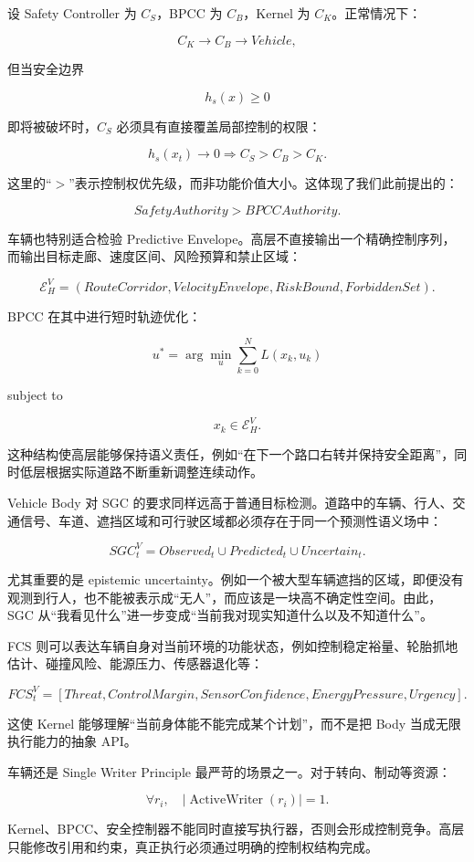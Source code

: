 设 Safety Controller 为 $C_S$，BPCC 为 $C_B$，Kernel 为 $C_K$。正常情况下：

$$
C_K\rightarrow C_B\rightarrow Vehicle,
$$

但当安全边界

$$
h_s(x)\geq0
$$

即将被破坏时，$C_S$ 必须具有直接覆盖局部控制的权限：

$$
h_s(x_t)\rightarrow0
\Rightarrow
C_S>C_B>C_K.
$$

这里的“$>$”表示控制权优先级，而非功能价值大小。这体现了我们此前提出的：

$$
\boxed{
SafetyAuthority>BPCCAuthority.
}
$$

车辆也特别适合检验 Predictive Envelope。高层不直接输出一个精确控制序列，而输出目标走廊、速度区间、风险预算和禁止区域：

$$
\mathcal E_H^V
=
(
RouteCorridor,
VelocityEnvelope,
RiskBound,
ForbiddenSet
).
$$

BPCC 在其中进行短时轨迹优化：

$$
u^{*}
=
\arg\min_u
\sum_{k=0}^{N}
L(x_k,u_k)
$$

subject to

$$
x_k\in\mathcal E_H^V.
$$

这种结构使高层能够保持语义责任，例如“在下一个路口右转并保持安全距离”，同时低层根据实际道路不断重新调整连续动作。

Vehicle Body 对 SGC 的要求同样远高于普通目标检测。道路中的车辆、行人、交通信号、车道、遮挡区域和可行驶区域都必须存在于同一个预测性语义场中：

$$
SGC_t^V
=
Observed_t
\cup
Predicted_t
\cup
Uncertain_t.
$$

尤其重要的是 epistemic uncertainty。例如一个被大型车辆遮挡的区域，即便没有观测到行人，也不能被表示成“无人”，而应该是一块高不确定性空间。由此，SGC 从“我看见什么”进一步变成“当前我对现实知道什么以及不知道什么”。

FCS 则可以表达车辆自身对当前环境的功能状态，例如控制稳定裕量、轮胎抓地估计、碰撞风险、能源压力、传感器退化等：

$$
FCS_t^V
=
[
Threat,
ControlMargin,
SensorConfidence,
EnergyPressure,
Urgency
].
$$

这使 Kernel 能够理解“当前身体能不能完成某个计划”，而不是把 Body 当成无限执行能力的抽象 API。

车辆还是 Single Writer Principle 最严苛的场景之一。对于转向、制动等资源：

$$
\forall r_i,
\quad
|\operatorname{ActiveWriter}(r_i)|=1.
$$

Kernel、BPCC、安全控制器不能同时直接写执行器，否则会形成控制竞争。高层只能修改引用和约束，真正执行必须通过明确的控制权结构完成。

